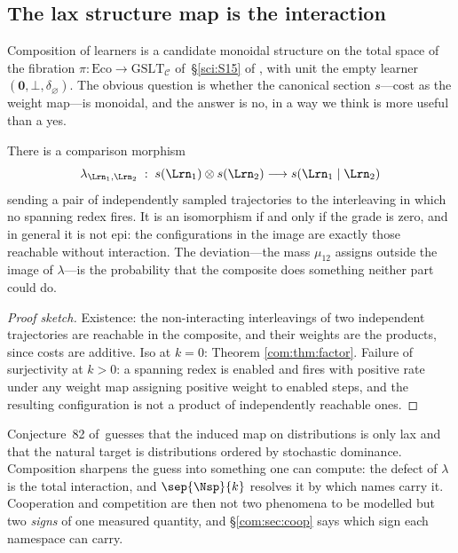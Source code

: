 \subsection{The lax structure map is the interaction}\label{com:S4.3}

Composition of learners is a candidate monoidal structure on the total space of the fibration
$\pi : \mathrm{Eco} \to \mathrm{GSLT}_{\mathcal{C}}$ of~\S\ref{sci:S15} of \chSci, with unit the
empty learner $(\mathbf{0}, \bot, \delta_{\varnothing})$. The obvious question is whether the
canonical section $s$---cost as the weight map---is monoidal, and the answer is no, in a way we
think is more useful than a yes.

\begin{proposition}\label{com:prop:lax}
There is a comparison morphism
\[
  \lambda_{\Lrn_1,\Lrn_2} \;:\; s(\Lrn_1) \otimes s(\Lrn_2) \longrightarrow s(\Lrn_1 \mid \Lrn_2)
\]
sending a pair of independently sampled trajectories to the interleaving in which no spanning
redex fires. It is an isomorphism if and only if the grade is zero, and in general it is not
epi: the configurations in the image are exactly those reachable without interaction. The
deviation---the mass $\mu_{12}$ assigns outside the image of $\lambda$---is the probability that
the composite does something neither part could do.
\end{proposition}

\begin{proof}[Proof sketch]
Existence: the non-interacting interleavings of two independent trajectories are reachable in the
composite, and their weights are the products, since costs are additive. Iso at $k=0$: Theorem
\ref{com:thm:factor}. Failure of surjectivity at $k>0$: a spanning redex is enabled and fires with
positive rate under any weight map assigning positive weight to enabled steps, and the resulting
configuration is not a product of independently reachable ones.
\end{proof}

\begin{remark}\label{com:good-news-that-laxity}
Conjecture~82 of~\chSci guesses that the induced map on distributions is only lax and
that the natural target is distributions ordered by stochastic dominance. Composition sharpens
the guess into something one can compute: the defect of $\lambda$ is the total interaction, and
$\sep{\Nsp}{k}$ resolves it by which names carry it. Cooperation and competition are then not two
phenomena to be modelled but two \emph{signs} of one measured quantity, and \S\ref{com:sec:coop} says
which sign each namespace can carry.
\end{remark}

